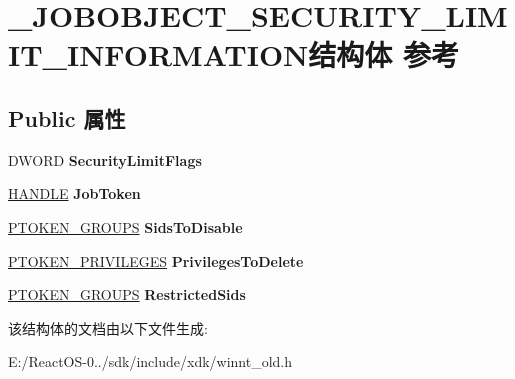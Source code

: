 \hypertarget{struct___j_o_b_o_b_j_e_c_t___s_e_c_u_r_i_t_y___l_i_m_i_t___i_n_f_o_r_m_a_t_i_o_n}{}\section{\+\_\+\+J\+O\+B\+O\+B\+J\+E\+C\+T\+\_\+\+S\+E\+C\+U\+R\+I\+T\+Y\+\_\+\+L\+I\+M\+I\+T\+\_\+\+I\+N\+F\+O\+R\+M\+A\+T\+I\+O\+N结构体 参考}
\label{struct___j_o_b_o_b_j_e_c_t___s_e_c_u_r_i_t_y___l_i_m_i_t___i_n_f_o_r_m_a_t_i_o_n}
\subsection*{Public 属性}
\begin{DoxyCompactItemize}
\item 
\mbox{\label{struct___j_o_b_o_b_j_e_c_t___s_e_c_u_r_i_t_y___l_i_m_i_t___i_n_f_o_r_m_a_t_i_o_n_ae1727e675d5b324864eed7a1506215ff}} 
D\+W\+O\+RD {\bfseries Security\+Limit\+Flags}
\item 
\mbox{\label{struct___j_o_b_o_b_j_e_c_t___s_e_c_u_r_i_t_y___l_i_m_i_t___i_n_f_o_r_m_a_t_i_o_n_a46c5525c154c907c222217c7bdb9eed1}} 
\hyperlink{interfacevoid}{H\+A\+N\+D\+LE} {\bfseries Job\+Token}
\item 
\mbox{\label{struct___j_o_b_o_b_j_e_c_t___s_e_c_u_r_i_t_y___l_i_m_i_t___i_n_f_o_r_m_a_t_i_o_n_a2be6b43717a12ce9d1072d92544453ff}} 
\hyperlink{struct___t_o_k_e_n___g_r_o_u_p_s}{P\+T\+O\+K\+E\+N\+\_\+\+G\+R\+O\+U\+PS} {\bfseries Sids\+To\+Disable}
\item 
\mbox{\label{struct___j_o_b_o_b_j_e_c_t___s_e_c_u_r_i_t_y___l_i_m_i_t___i_n_f_o_r_m_a_t_i_o_n_a94faa44fbd186b89f149fa5f238fcba8}} 
\hyperlink{struct___t_o_k_e_n___p_r_i_v_i_l_e_g_e_s}{P\+T\+O\+K\+E\+N\+\_\+\+P\+R\+I\+V\+I\+L\+E\+G\+ES} {\bfseries Privileges\+To\+Delete}
\item 
\mbox{\label{struct___j_o_b_o_b_j_e_c_t___s_e_c_u_r_i_t_y___l_i_m_i_t___i_n_f_o_r_m_a_t_i_o_n_a388704d394b6baf879126c4c86080cc1}} 
\hyperlink{struct___t_o_k_e_n___g_r_o_u_p_s}{P\+T\+O\+K\+E\+N\+\_\+\+G\+R\+O\+U\+PS} {\bfseries Restricted\+Sids}
\end{DoxyCompactItemize}


该结构体的文档由以下文件生成\+:\begin{DoxyCompactItemize}
\item 
E\+:/\+React\+O\+S-\/0../sdk/include/xdk/winnt\+\_\+old.\+h\end{DoxyCompactItemize}
